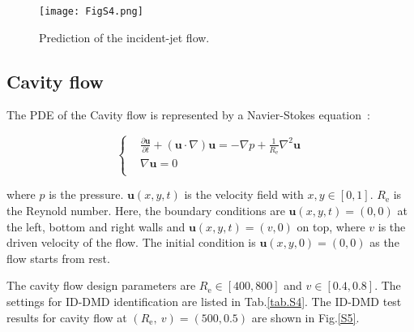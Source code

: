 \begin{figure}[!ht]
  \centering
  \texttt{[image: FigS4.png]}
  \caption{
  Prediction of the incident-jet flow.
  }
  \label{S4}
\end{figure}

\subsection{Cavity flow}
The PDE of the Cavity flow is represented by a Navier-Stokes equation~\cite{bruneau20062d}:

\begin{equation}
    \left\{\begin{aligned}
    & \frac{\partial \mathbf{u}}{\partial t}+(\mathbf{u}\cdot \nabla)\mathbf{u}=-\nabla p+\frac{1}{{R}_\text{e}}{{\nabla}^{2}}\mathbf{u} \\ 
    & \nabla \mathbf{u}=0 \\ 
    \end{aligned} \right. \label{eqS24}
\end{equation}

\noindent where $p$ is the pressure. $\mathbf{u}(x,y,t)$ is the velocity field with $x,y\in [0,1]$. ${R}_\text{e}$ is the Reynold number. Here, the boundary conditions are $\mathbf{u}(x,y,t)=(0,0)$ at the left, bottom and right walls and $\mathbf{u}(x,y,t)=(v,0)$ on top, where $v$ is the driven velocity of the flow. The initial condition is $\mathbf{u}(x,y,0)=(0,0)$ as the flow starts from rest. 

The cavity flow design parameters are ${R}_\text{e}\in [400,800]$ and $v\in [0.4,0.8]$. The settings for ID-DMD identification are listed in Tab.\ref{tab.S4}. The ID-DMD test results for cavity flow at $({R}_\text{e},\ v)=(500,0.5)$ are shown in Fig.\ref{S5}.

